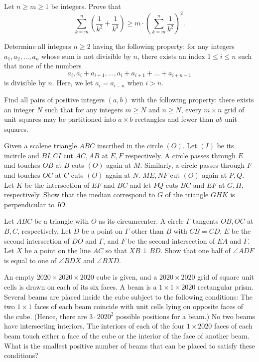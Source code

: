 \documentclass[11pt]{scrartcl}
\begin{document}
\begin{problem}[4479133443678014025]
Let $n\ge m\ge 1$ be integers. Prove that
\[\sum_{k=m}^n \left (\frac 1{k^2}+\frac 1{k^3}\right) \ge m\cdot \left(\sum_{k=m}^n \frac 1{k^2}\right)^2.\]
\end{problem}
\begin{problem}[676918769934959]
Determine all integers $ n\geq 2$ having the following property: for any integers $a_1,a_2,\ldots, a_n$ whose sum is not divisible by $n$, there exists an index $1 \leq i \leq n$ such that none of the numbers$$a_i,a_i+a_{i+1},\ldots,a_i+a_{i+1}+\ldots+a_{i+n-1}$$is divisible by $n$. Here, we let $a_i=a_{i-n}$ when $i >n$.
\end{problem}
\begin{problem}[771774560036862]
	Find all pairs of positive integers \((a,b)\) with the following property: there exists an integer \(N\) such that for any integers \(m\ge N\) and \(n\ge N\), every \(m\times n\) grid of unit squares may be partitioned into \(a\times b\) rectangles and fewer than \(ab\) unit squares.
\end{problem}
\begin{problem}[86986480818494]
Given a scalene triangle $ABC$ inscribed in the circle $(O)$. Let $(I)$ be its incircle and $BI,CI$ cut $AC,AB$ at $E,F$ respectively. A circle passes through $E$ and touches $OB$ at $B$ cuts $(O)$ again at $M$. Similarly, a circle passes through $F$ and touches $OC$ at $C$ cuts $(O)$ again at $N$. $ME,NF$ cut $(O)$ again at $P,Q$. Let $K$ be the intersection of $EF$ and $BC$ and let $PQ$ cuts $BC$ and $EF$ at $G,H$, respectively. Show that the median correspond to $G$ of the triangle $GHK$ is perpendicular to $IO$.
\end{problem}
\begin{problem}[537574018594693]
Let $ABC$ be a triangle with $O$ as its circumcenter. A circle $\Gamma$ tangents $OB, OC$ at $B, C$, respectively. Let $D$ be a point on $\Gamma$ other than $B$ with $CB=CD$, $E$ be the second intersection of $DO$ and $\Gamma$, and $F$ be the second intersection of $EA$ and $\Gamma$. Let $X$ be a point on the line $AC$ so that $XB\perp BD$. Show that one half of $\angle ADF$ is equal to one of $\angle BDX$ and $\angle BXD$.
\end{problem}
\begin{problem}[4320337590540710547]
	An empty $2020 \times 2020 \times 2020$ cube is given, and a $2020 \times 2020$ grid of square unit cells is drawn on each of its six faces. A beam is a $1 \times 1 \times 2020$ rectangular prism. Several beams are placed inside the cube subject to the following conditions:
The two $1 \times 1$ faces of each beam coincide with unit cells lying on opposite faces of the cube. (Hence, there are $3 \cdot {2020}^2$ possible positions for a beam.)
No two beams have intersecting interiors.
The interiors of each of the four $1 \times 2020$ faces of each beam touch either a face of the cube or the interior of the face of another beam.
What is the smallest positive number of beams that can be placed to satisfy these conditions?
\end{problem}
\end{document}
